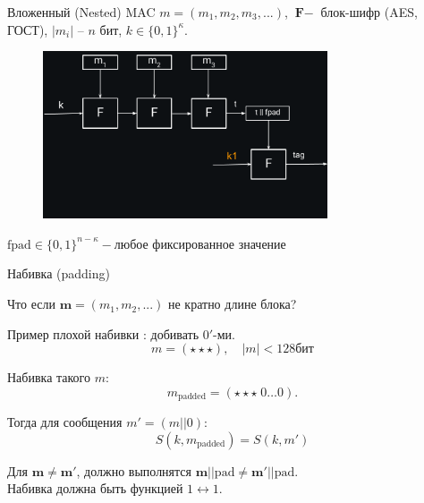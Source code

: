 \documentclass[usenames,dvipsnames,8pt,aspectratio=169]{beamer}
\begin{document}
\begin{frame}{Вложенный (Nested) MAC}
	\Large
	\vspace{-25pt}
	$m = (m_1, m_2, m_3, ...)$, $\textbf{F}-$ блок-шифр (AES, ГОСТ), $|m_i|$ -- $n$ бит, $k  \in \{0,1\}^\kappa$.
	\begin{figure}
		\includegraphics[width=0.75\textwidth]{NMAC}
	\end{figure}
\vspace{-40pt}
$
	\text{fpad} \in \{0,1\}^{n - \kappa} -\text{любое фиксированное значение}
$
\end{frame}

\begin{frame}{Набивка (padding)}
\Large
\begin{center}
Что если $\mathbf{m} = (m_1, m_2, ...)$ не кратно длине блока?
\end{center}
Пример {\color{Orange} плохой} набивки : добивать $0'$-ми.
\[m = (\star \star \star  ), \quad |m|< 128 \text{бит}\] 

Набивка такого $m$:
\[m_{\text{padded}}=(\star \star \star  \; 0 \ldots 0  ). \] 

Тогда для сообщения $m' = (m||0)$:
\[S(k,m_{\text{padded}}) = S(k, m')\]

\vspace{10pt}
\centering
Для $\mathbf{m} \neq \mathbf{m'}$, должно выполнятся $\mathbf{m}||\text{pad} \neq \mathbf{m'}||\text{pad}$. \\[5pt]
 Набивка должна быть функцией $1 \leftrightarrow 1$.
	
\end{frame}
\end{document}
